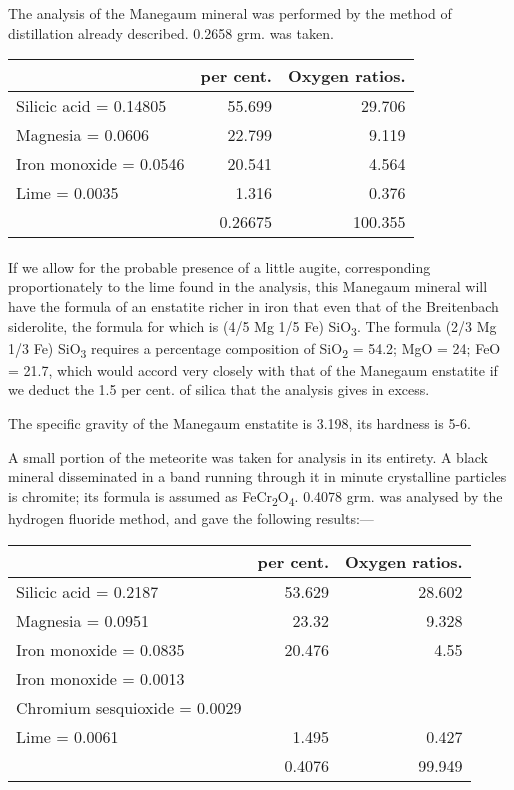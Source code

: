 \documentclass[a4paper, 12pt, oneside]{article}
\begin{document}
The analysis of the Manegaum mineral was performed by the method of distillation already described. 0.2658 grm. was taken.
\begin{table}[H]
    \centering
    \footnotesize
    \begin{tabular}{l r r}
        ~ & per cent. & Oxygen ratios. \\ \hline
        Silicic acid = 0.14805 & 55.699 & 29.706 \\
        Magnesia = 0.0606 & 22.799 & 9.119 \\
        Iron monoxide = 0.0546 & 20.541 & 4.564 \\
        Lime = 0.0035 & 1.316 & 0.376 \\ \hline
        ~ & 0.26675 & 100.355 \\
    \end{tabular}
\end{table}
\paragraph{}
If we allow for the probable presence of a little augite, corresponding proportionately to the lime found in the analysis, this Manegaum mineral will have the formula of an enstatite richer in iron that even that of the Breitenbach siderolite, the formula for which is (4/5 Mg 1/5 Fe) SiO\textsubscript{3}. The formula (2/3 Mg 1/3 Fe) SiO\textsubscript{3} requires a percentage composition of SiO\textsubscript{2} = 54.2; MgO = 24; FeO = 21.7, which would accord very closely with that of the Manegaum enstatite if we deduct the 1.5 per cent. of silica that the analysis gives in excess.

The specific gravity of the Manegaum enstatite is 3.198, its hardness is 5-6.

A small portion of the meteorite was taken for analysis in its entirety. A black mineral disseminated in a band running through it in minute crystalline particles is chromite; its formula is assumed as FeCr\textsubscript{2}O\textsubscript{4}. 0.4078 grm. was analysed by the hydrogen fluoride method, and gave the following results:---
\begin{table}[H]
    \centering
    \footnotesize
    \begin{tabular}{l r r}
        ~ & per cent. & Oxygen ratios. \\ \hline
        Silicic acid = 0.2187 & 53.629 & 28.602 \\
        Magnesia = 0.0951 & 23.32 & 9.328 \\
        Iron monoxide = 0.0835 & 20.476 & 4.55 \\
        Iron monoxide = 0.0013 & ~ & ~ \\
        Chromium sesquioxide = 0.0029 & ~ & ~ \\
        Lime = 0.0061 & 1.495 & 0.427 \\ \hline
        ~ & 0.4076 & 99.949 \\
    \end{tabular}
\end{table}
\end{document}
